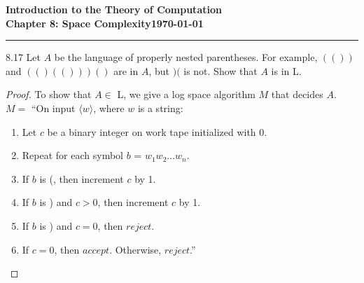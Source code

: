 \documentclass[11pt]{article}
\newcommand{\dated}{\today}
\begin{document}
\textbf{Introduction to the Theory of
Computation}\hfill\textbf{\myname}\\[0.01in]
\textbf{Chapter 8: Space Complexity}\hfill\textbf{\dated}\\
\smallskip\hrule\bigskip

\begin{problem}{8.17}
Let $A$ be the language of properly nested parentheses. For example, $(())$ and $(()(()))()$ are in $A$, but $)($ is not. Show that $A$ is in L.
\end{problem}

\begin{proof}
To show that $A \in$ L, we give a log space algorithm $M$ that decides $A$. \\

$M =$ \textquotedblleft On input $\langle w \rangle$, where $w$ is a string:
\begin{enumerate}
\item Let $c$ be a binary integer on work tape initialized with 0.
\item Repeat for each symbol $b$ = $w_1w_2 \ldots w_n$.
\item \hspace*{0.5cm} If $b$ is (, then increment $c$ by 1.
\item \hspace*{0.5cm} If $b$ is ) and $c > 0$, then increment $c$ by 1.
\item \hspace*{0.5cm} If $b$ is ) and $c = 0$, then $reject$.
\item If $c = 0$, then $accept$. Otherwise, $reject$.\textquotedblright
\end{enumerate}
\end{proof}
\end{document}
